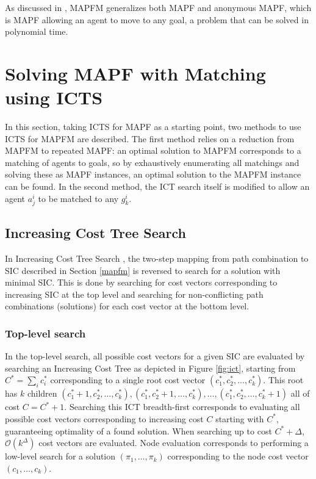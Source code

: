 \documentclass[english]{article}
\begin{document}
	As discussed in \cite{ma2016}, MAPFM generalizes both MAPF and anonymous MAPF, which is MAPF allowing an agent to move to any goal, a problem that can be solved in polynomial time.
	\section{Solving MAPF with Matching using ICTS} %
	\label{section:icts-matching}
	In this section, taking ICTS for MAPF as a starting point, two methods to use ICTS for MAPFM are described. The first method relies on a reduction from MAPFM to repeated MAPF: an optimal solution to MAPFM corresponds to a matching of agents to goals, so by exhaustively enumerating all matchings and solving these as MAPF instances, an optimal solution to the MAPFM instance can be found. In the second method, the ICT search itself is modified to allow an agent $a_j^i$ to be matched to any $g_k^i$.
	\subsection{Increasing Cost Tree Search}
	\label{icts}
	In Increasing Cost Tree Search \cite{sharon2013}, the two-step mapping from path combination to SIC described in Section \ref{mapfm} is reversed to search for a solution with minimal SIC. This is done by searching for cost vectors corresponding to increasing SIC at the top level and searching for non-conflicting path combinations (solutions) for each cost vector at the bottom level. 
	
	\subsubsection{Top-level search}
	In the top-level search, all possible cost vectors for a given SIC are evaluated by searching an Increasing Cost Tree as depicted in Figure \ref{fig:ict}, starting from $C^* = \sum_i c^*_i$ corresponding to a single root cost vector $(c^*_1,c^*_2,\ldots,c^*_k)$. This root has $k$ children $(c^*_1 + 1,c^*_2,\ldots,c^*_k),(c^*_1,c^*_2 + 1,\ldots,c^*_k),\ldots,(c^*_1,c^*_2,\ldots,c^*_k + 1)$ all of cost $C = C^* + 1$. Searching this ICT breadth-first corresponds to evaluating all possible cost vectors corresponding to increasing cost $C$ starting with $C^*$, guaranteeing optimality of a found solution. When searching up to  cost $C^* + \Delta$, $\mathcal{O}(k^\Delta)$ cost vectors are evaluated. Node evaluation corresponds to performing a low-level search for a solution $(\pi_1,\ldots,\pi_k)$ corresponding to the node cost vector $(c_1,\ldots,c_k)$.
	
\end{document}
